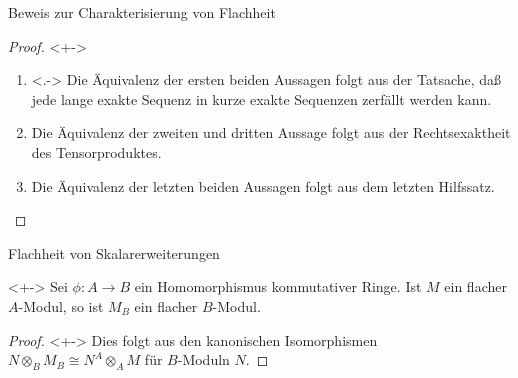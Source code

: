 \begin{frame}{Beweis zur Charakterisierung von Flachheit}
	\begin{proof}<+->
		\begin{enumerate}[<+->]
		\item<.->
			Die Äquivalenz der ersten beiden Aussagen folgt aus der Tatsache, daß jede lange exakte Sequenz in kurze
			exakte Sequenzen zerfällt werden kann.
		\item
			Die Äquivalenz der zweiten und dritten Aussage folgt aus der Rechtsexaktheit des Tensorproduktes.
		\item
			Die Äquivalenz der letzten beiden Aussagen folgt aus dem letzten Hilfssatz.
			\qedhere
		\end{enumerate}
	\end{proof}
\end{frame}

\begin{frame}{Flachheit von Skalarerweiterungen}
	\begin{proposition}<+->
		Sei \(\phi\colon A \to B\) ein Homomorphismus kommutativer Ringe. Ist \(M\) ein flacher \(A\)-Modul, so ist
		\(M_B\) ein flacher \(B\)-Modul.
	\end{proposition}
	\begin{proof}<+->
		Dies folgt aus den kanonischen Isomorphismen \(N \otimes_B M_B \cong N^A \otimes_A M\) für \(B\)-Moduln \(N\).
	\end{proof}
\end{frame}

